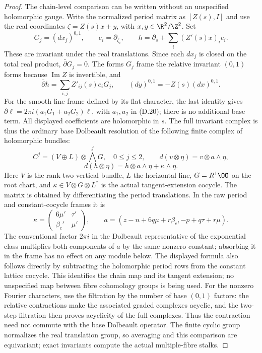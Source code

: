 \begin{proof}
The chain-level comparison can be written without an unspecified
holomorphic gauge. Write the normalized period matrix as $[Z(s),I]$
and use the real coordinates $\zeta=Z(s)x+y$, with
$x,y\in\R^2/\Z^2$. Set
\[
 G_j=(dx_j)^{0,1},\qquad e_i=\partial_{\zeta_i},\qquad
 h=\partial_s+\sum_i(Z'(s)x)_i e_i.
\]
These are invariant under the real translations. Since each $dx_j$
is closed on the total real product, $\bar\partial G_j=0$.
The forms $G_j$ frame the relative invariant $(0,1)$ forms because
$\operatorname{Im}Z$ is invertible, and
\[
 \bar\partial h=\sum_{i,j}Z'_{ij}(s)e_iG_j,
 \qquad (dy)^{0,1}=-Z(s)(dx)^{0,1}.
\]
For the smooth line frame defined by its flat character, the last
identity gives $\bar\partial\ell=2\pi i(a_1G_1+a_2G_2)\ell$,
with $a_1,a_2$ in (D.20); there is no additional base term.
All displayed coefficients are holomorphic in $s$. The full
invariant complex is thus the ordinary base Dolbeault resolution
of the following finite complex of holomorphic bundles:
\[
 C^j=(V\oplus L)\otimes\bigwedge^jG,\quad0\le j\le2,
 \qquad
 d(v\otimes\eta)=v\otimes a\wedge\eta,
\]
\[
 d(h\otimes\eta)=h\otimes a\wedge\eta+\kappa\wedge\eta. \tag{D.19}
\]
Here $V$ is the rank-two vertical bundle, $L$ the horizontal line,
$G=R^1\OO$ on the root chart, and $\kappa\in V\otimes G\otimes L^*$
is the actual tangent-extension cocycle. The matrix is obtained
by differentiating the period translations. In the raw period and
constant-cocycle frames it is
\[
 \kappa=\begin{pmatrix}6\mu'&\tau'\\\beta_c'&\mu'\end{pmatrix},
 \qquad
 a=(z-n+6q\mu+r\beta_c,-p+q\tau+r\mu).               \tag{D.20}
\]
The conventional factor $2\pi i$ in the Dolbeault representative of
the exponential class multiplies both components of $a$ by the
same nonzero constant; absorbing it in the frame has no effect on
any module below. The displayed formula also follows directly by
subtracting the holomorphic period rows from the constant lattice
cocycle. This identifies the chain map and its tangent extension;
no unspecified map between fibre cohomology groups is being used.
For the nonzero Fourier characters, use the filtration by the number
of base $(0,1)$ factors: the relative contractions make the associated
graded complexes acyclic, and the two-step filtration then proves
acyclicity of the full complexes. Thus the contraction need not
commute with the base Dolbeault operator. The finite cyclic group
normalizes the real translation group, so averaging and this
comparison are equivariant; exact invariants compute the actual
multiple-fibre stalks.


\end{proof}
